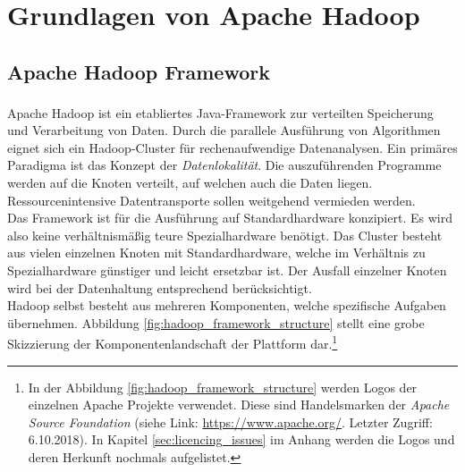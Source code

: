 \chapter{Grundlagen von Apache Hadoop\textsuperscript{\textregistered}}
\label{ch:theory_hadoop}

\section{Apache Hadoop Framework}
\label{sec:theory_hadoop}
\noindent
Apache Hadoop\textsuperscript{\textregistered} ist ein etabliertes Java-Framework zur verteilten Speicherung und Verarbeitung von Daten. Durch die parallele Ausführung von Algorithmen eignet sich ein Hadoop-Cluster für rechenaufwendige Datenanalysen. Ein primäres Paradigma ist das Konzept der \textit{Datenlokalität}. Die auszuführenden Programme werden auf die Knoten verteilt, auf welchen auch die Daten liegen. Ressourcenintensive Datentransporte sollen weitgehend vermieden werden.\cite[S. 20 ff.]{big_data_praxis}\\ 
Das Framework ist für die Ausführung auf Standardhardware konzipiert. Es wird also keine verhältnismäßig teure Spezialhardware benötigt. Das Cluster besteht aus vielen einzelnen Knoten mit Standardhardware, welche im Verhältnis zu Spezialhardware günstiger und leicht ersetzbar ist. Der Ausfall einzelner Knoten wird bei der Datenhaltung entsprechend berücksichtigt. \\

\noindent
Hadoop selbst besteht aus mehreren Komponenten, welche spezifische Aufgaben übernehmen. Abbildung \ref{fig:hadoop_framework_structure} stellt eine grobe Skizzierung der Komponentenlandschaft der Plattform dar.\footnote{In der Abbildung \ref{fig:hadoop_framework_structure} werden Logos der einzelnen Apache Projekte verwendet. Diese sind Handelsmarken der \textit{Apache Source Foundation} (siehe Link: \url{https://www.apache.org/}. Letzter Zugriff: 6.10.2018). In Kapitel \ref{sec:licencing_issues} im Anhang werden die Logos und deren Herkunft nochmals aufgelistet.}\\

